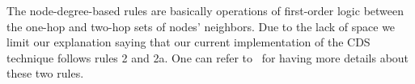 %
The node-degree-based rules are basically operations of first-order logic between the one-hop and two-hop sets of nodes' neighbors.
%
Due to the lack of space we limit our explanation saying that our current implementation of the CDS technique follows rules 2 and 2a.
%
One can refer to~\cite{Wu2001} for having more details about these two rules.


%

